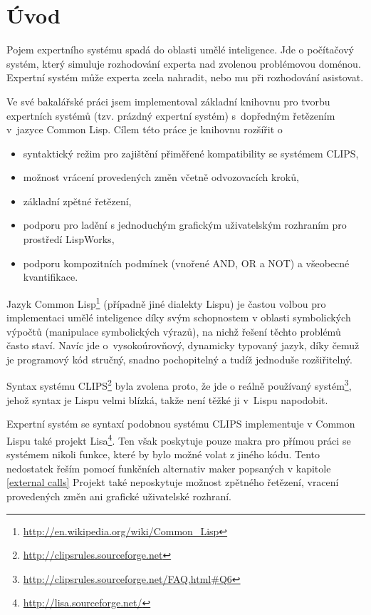 \section{Úvod}

Pojem expertního systému spadá do oblasti umělé inteligence. Jde o počítačový
systém, který simuluje rozhodování experta nad zvolenou problémovou doménou.
Expertní systém může experta zcela nahradit, nebo mu při rozhodování asistovat.

Ve své bakalářské práci \cite{bakalarka} jsem implementoval základní knihovnu
pro tvorbu expertních systémů (tzv. prázdný expertní systém) s~dopředným
řetězením v~jazyce Common Lisp. Cílem této práce je knihovnu rozšířit o
\begin{itemize}
  \item syntaktický režim pro zajištění přiměřené kompatibility se systémem
    CLIPS,
  \item možnost vrácení provedených změn včetně odvozovacích kroků,
  \item základní zpětné řetězení,
  \item podporu pro ladění s jednoduchým grafickým uživatelským rozhraním pro
    prostředí LispWorks\texttrademark,
  \item podporu kompozitních podmínek (vnořené AND, OR a NOT) a všeobecné
    kvantifikace.
\end{itemize}

Jazyk Common Lisp\footnote{\url{http://en.wikipedia.org/wiki/Common\_Lisp}}
(případně jiné dialekty Lispu) je častou volbou pro implementaci umělé
inteligence díky svým schopnostem v oblasti symbolických výpočtů (manipulace
symbolických výrazů), na nichž řešení těchto problémů často staví. Navíc jde
o~vysokoúrovňový, dynamicky typovaný jazyk, díky čemuž je programový kód
stručný, snadno pochopitelný a tudíž jednoduše rozšiřitelný.

Syntax systému CLIPS\footnote{\url{http://clipsrules.sourceforge.net}} byla
zvolena proto, že jde o reálně používaný
systém\footnote{\url{http://clipsrules.sourceforge.net/FAQ.html\#Q6}}, jehož
syntax je Lispu velmi blízká, takže není těžké ji v~Lispu napodobit.

Expertní systém se syntaxí podobnou systému CLIPS implementuje v Common Lispu
také projekt Lisa\footnote{\url{http://lisa.sourceforge.net/}}. Ten však
poskytuje pouze makra pro přímou práci se systémem nikoli funkce, které by bylo
možné volat z jiného kódu. Tento nedostatek řeším pomocí funkčních alternativ
maker popsaných v kapitole \ref{external calls} Projekt také neposkytuje možnost
zpětného řetězení, vracení provedených změn ani grafické uživatelské rozhraní.

